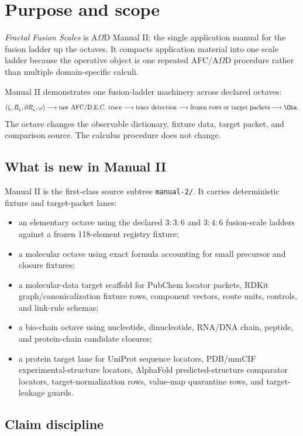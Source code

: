 \section{Purpose and scope}

\emph{Fractal Fusion Scales} is A$\Omega$D Manual II: the single application manual for the fusion ladder up the octaves. It compacts application material into one scale ladder because the operative object is one repeated AFC/A$\Omega$D procedure rather than multiple domain-specific calculi.

Manual II demonstrates one fusion-ladder machinery across declared octaves:
\[
(\zeta,R_\zeta,\partial R_\zeta,\omega)
\longrightarrow
\text{raw AFC/D.E.C. trace}
\longrightarrow
\text{trace detection}
\longrightarrow
\text{frozen rows or target packets}
\longrightarrow
\Obs.
\]
The octave changes the observable dictionary, fixture data, target packet, and comparison source. The calculus procedure does not change.

\subsection{What is new in Manual II}

Manual II is the first-class source subtree \texttt{manual-2/}. It carries deterministic fixture and target-packet lanes:
\begin{itemize}[leftmargin=2em]
  \item an elementary octave using the declared $3{:}3{:}6$ and $3{:}4{:}6$ fusion-scale ladders against a frozen 118-element registry fixture;
  \item a molecular octave using exact formula accounting for small precursor and closure fixtures;
  \item a molecular-data target scaffold for PubChem locator packets, RDKit graph/canonicalization fixture rows, component vectors, route units, controls, and link-rule schemas;
  \item a bio-chain octave using nucleotide, dinucleotide, RNA/DNA chain, peptide, and protein-chain candidate closures;
  \item a protein target lane for UniProt sequence locators, PDB/mmCIF experimental-structure locators, AlphaFold predicted-structure comparator locators, target-normalization rows, value-map quarantine rows, and target-leakage guards.
\end{itemize}

\subsection{Claim discipline}

